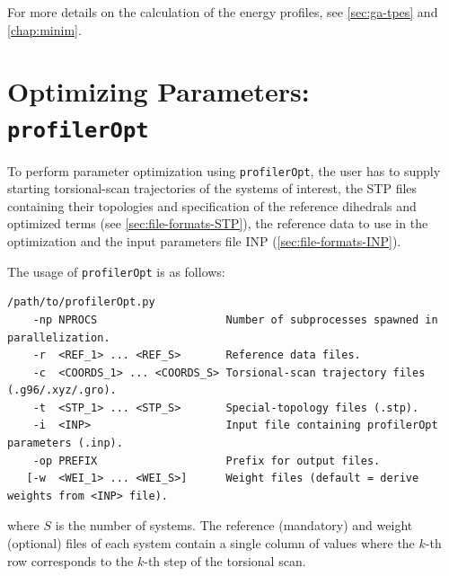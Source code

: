 \documentclass[10pt,a4paper,openany]{memoir}
\numberwithin{equation}{section}
\newcommand{\profileropt}[0]{\texttt{profilerOpt}}
\begin{document}
For more details on the calculation of the energy profiles, see \autoref{sec:ga-tpes} and \autoref{chap:minim}.

\section{Optimizing Parameters: \profileropt{}}
\label{sec:program-opt}

To perform parameter optimization using \profileropt{}, the user has
to supply starting torsional-scan trajectories of the systems of
interest, the STP files containing their topologies and specification
of the reference dihedrals and optimized terms (see
\autoref{sec:file-formats-STP}), the reference data to use in the
optimization and the input parameters file INP
(\autoref{sec:file-formats-INP}).

The usage of \profileropt{} is as follows:

\begin{lstlisting}
/path/to/profilerOpt.py
    -np NPROCS                    Number of subprocesses spawned in parallelization.
    -r  <REF_1> ... <REF_S>       Reference data files.
    -c  <COORDS_1> ... <COORDS_S> Torsional-scan trajectory files (.g96/.xyz/.gro).
    -t  <STP_1> ... <STP_S>       Special-topology files (.stp).
    -i  <INP>                     Input file containing profilerOpt parameters (.inp).
    -op PREFIX                    Prefix for output files.
   [-w  <WEI_1> ... <WEI_S>]      Weight files (default = derive weights from <INP> file).
\end{lstlisting}\vspace{1ex}

\noindent where $S$ is the number of systems.
The reference (mandatory) and weight (optional) files of each system contain a single column
of values where the $k$-th row corresponds to the $k$-th step of the
torsional scan.
\end{document}
